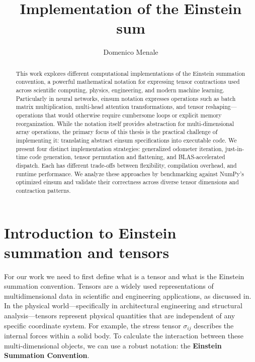 \documentclass[binding=0.6cm]{sapthesis}
\title{Implementation of the Einstein sum}
\author{Domenico Menale}
\begin{document}
\frontmatter
\maketitle
\dedication{Imagination is more important than knowledge\\ Albert Einstein}
\begin{abstract}
	This work explores different computational implementations of the Einstein summation convention, a powerful mathematical notation for expressing tensor contractions used across scientific computing, physics, engineering, and modern machine learning. Particularly in neural networks, einsum notation expresses operations such as batch matrix multiplication, multi-head attention transformations, and tensor reshaping—operations that would otherwise require cumbersome loops or explicit memory reorganization.
	While the notation itself provides abstraction for multi-dimensional array operations, the primary focus of this thesis is the practical challenge of implementing it: translating abstract einsum specifications into executable code. We present four distinct implementation strategies: generalized odometer iteration, just-in-time code generation, tensor permutation and flattening, and BLAS-accelerated dispatch. Each has different trade-offs between flexibility, compilation overhead, and runtime performance. We analyze these approaches by benchmarking against NumPy's optimized einsum and validate their correctness across diverse tensor dimensions and contraction patterns.
\end{abstract}

\tableofcontents

\mainmatter

\chapter{Introduction to Einstein summation and tensors}

For our work we need to first define what is a tensor and what is the Einstein summation convention.
Tensors are a widely used representations of multidimensional data in scientific and engineering applications, as discussed in\cite{Klaus2023CompilingTE}.
In the physical world—specifically in architectural engineering and structural analysis—tensors represent physical quantities that are independent
of any specific coordinate system. For example, the stress tensor $\sigma_{ij}$ describes the internal forces within a solid body.
To calculate the interaction between these multi-dimensional objects, we can use a robust notation: the \textbf{Einstein Summation Convention}.
\end{document}
